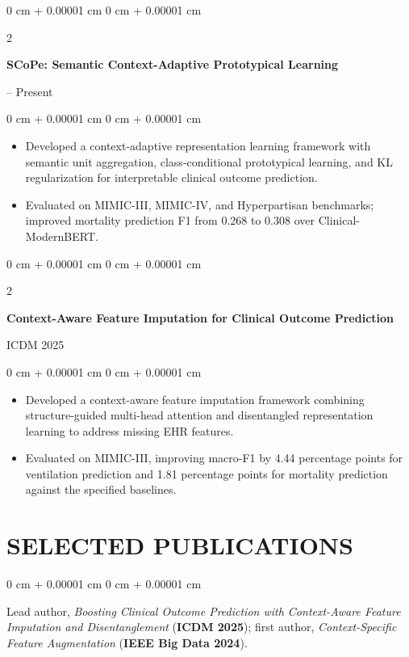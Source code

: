 \documentclass[10pt, letterpaper]{article}
\newenvironment{highlights}{
    \begin{itemize}[
        topsep=0.03 cm,
        parsep=0.03 cm,
        partopsep=0pt,
        itemsep=0pt,
        leftmargin=0 cm + 10pt
    ]
}{
    \end{itemize}
} %
\newenvironment{onecolentry}{
    \begin{adjustwidth}{
        0 cm + 0.00001 cm
    }{
        0 cm + 0.00001 cm
    }
}{
    \end{adjustwidth}
} %
\newenvironment{twocolentry}[2][]{
    \onecolentry
    \def\secondColumn{#2}
    \setcolumnwidth{\fill, 4.5 cm}
    \begin{paracol}{2}
}{
    \switchcolumn \raggedleft \secondColumn
    \end{paracol}
    \endonecolentry
} %
\begin{document}
\begin{twocolentry}{2026 -- Present}
\textbf{SCoPe: Semantic Context-Adaptive Prototypical Learning}
\end{twocolentry}
\begin{onecolentry}
\begin{highlights}
\item Developed a context-adaptive representation learning framework with semantic unit aggregation, class-conditional prototypical learning, and KL regularization for interpretable clinical outcome prediction.
\item Evaluated on MIMIC-III, MIMIC-IV, and Hyperpartisan benchmarks; improved mortality prediction F1 from 0.268 to 0.308 over Clinical-ModernBERT.
\end{highlights}
\end{onecolentry}
\vspace{0.06 cm}

\begin{twocolentry}{ICDM 2025}
\textbf{Context-Aware Feature Imputation for Clinical Outcome Prediction}
\end{twocolentry}
\begin{onecolentry}
\begin{highlights}
\item Developed a context-aware feature imputation framework combining structure-guided multi-head attention and disentangled representation learning to address missing EHR features.
\item Evaluated on MIMIC-III, improving macro-F1 by 4.44 percentage points for ventilation prediction and 1.81 percentage points for mortality prediction against the specified baselines.
\end{highlights}
\end{onecolentry}
\vspace{0.06 cm}
\section{SELECTED PUBLICATIONS}
\begin{onecolentry}
Lead author, \textit{Boosting Clinical Outcome Prediction with Context-Aware Feature Imputation and Disentanglement} (\textbf{ICDM 2025}); first author, \textit{Context-Specific Feature Augmentation} (\textbf{IEEE Big Data 2024}).
\end{onecolentry}
\end{document}
